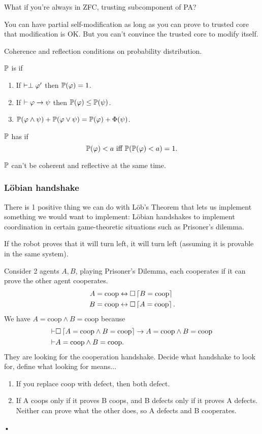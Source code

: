 \documentclass[11pt]{article}
\begin{document}

What if you're always in ZFC, trusting subcomponent of PA?

You can have partial self-modification as long as you can prove to trusted core that modification is OK. But you can't convince the trusted core to modify itself.

Coherence and reflection conditions on probability distribution.
\begin{df}
$\mathbb{P}$ is  if
\begin{enumerate}
\item
If $\vdash \perp \varphi'$ then $\mathbb{P}(\varphi)=1$. 
\item
If $\vdash \varphi\to \psi$ then $\mathbb{P}(\varphi) \le \mathbb{P}(\psi)$. 
\item
$\mathbb{P}(\varphi\wedge \psi)+ \mathbb{P}(\varphi\vee \psi) =\mathbb{P}(\varphi) + \Phi(\psi)$.
\end{enumerate}
$\mathbb{P}$ has  if
$$
\mathbb{P}(\varphi)<a \text{ iff } \mathbb{P}(\mathbb{P}(\varphi)<a)=1.
$$
\end{df}
$\mathbb{P}$ can't be coherent and reflective at the same time.

\subsubsection{L\"obian handshake}
There is 1 positive thing we can do with L\"ob's Theorem that lets us implement something we would want to implement: L\"obian handshakes to implement coordination in certain game-theoretic situations such as Prisoner's dilemma.

If the robot proves that it will turn left, it will turn left (assuming it is provable in the same system).

Consider 2 agents $A, B$, playing Prisoner's Dilemma, each cooperates if it can prove the other agent cooperates.
\begin{align}
A&=\text{coop} \leftrightarrow \square \left\lceil {B=\text{coop}}\right\rceil\\
B&=\text{coop} \leftrightarrow  \square \left\lceil {A=\text{coop}}\right\rceil.
\end{align}
We have $A=\text{coop}\wedge B=\text{coop} $ because
\begin{align}
\vdash& \square 
\left\lceil {A=\text{coop} \wedge B=\text{coop}}\right\rceil \to 
A=\text{coop}\wedge B=\text{coop}\\
\vdash &A=\text{coop}\wedge B= \text{coop}.
\end{align}
They are looking for the cooperation handshake. Decide what handshake to look for, define what looking for means...
\begin{enumerate}
\item
If you replace coop with defect, then both defect.
\item
If A coops only if it proves B coops, and B defects only if it proves A defects. Neither can prove what the other does, so A defects and B cooperates.
\end{enumerate}•
\end{document}
